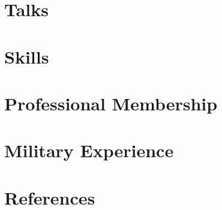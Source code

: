 \documentclass[letter,11pt]{article}
\begin{document}
\section{Talks}


\section{Skills}


\section{Professional Membership}


\section{Military Experience}


\section{References}

\end{document}
